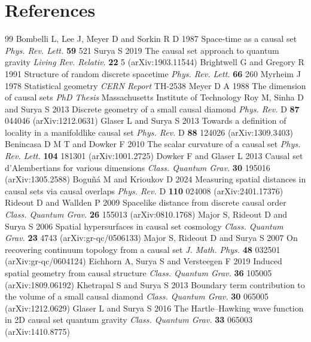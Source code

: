 \documentclass[12pt]{iopart}
\begin{document}
\section*{References}
\begin{thebibliography}{99}
 Bombelli L, Lee J, Meyer D and Sorkin R D 1987 Space-time as a causal set {\it Phys. Rev. Lett.} {\bf 59} 521
 Surya S 2019 The causal set approach to quantum gravity {\it Living Rev. Relativ.} {\bf 22} 5 (arXiv:1903.11544)
 Brightwell G and Gregory R 1991 Structure of random discrete spacetime {\it Phys. Rev. Lett.} {\bf 66} 260
 Myrheim J 1978 Statistical geometry {\it CERN Report} TH-2538
 Meyer D A 1988 The dimension of causal sets {\it PhD Thesis} Massachusetts Institute of Technology
 Roy M, Sinha D and Surya S 2013 Discrete geometry of a small causal diamond {\it Phys. Rev.} D {\bf 87} 044046 (arXiv:1212.0631)
 Glaser L and Surya S 2013 Towards a definition of locality in a manifoldlike causal set {\it Phys. Rev.} D {\bf 88} 124026 (arXiv:1309.3403)
 Benincasa D M T and Dowker F 2010 The scalar curvature of a causal set {\it Phys. Rev. Lett.} {\bf 104} 181301 (arXiv:1001.2725)
 Dowker F and Glaser L 2013 Causal set d'Alembertians for various dimensions {\it Class. Quantum Grav.} {\bf 30} 195016 (arXiv:1305.2588)
 Bogu\~n\'a M and Krioukov D 2024 Measuring spatial distances in causal sets via causal overlaps {\it Phys. Rev.} D {\bf 110} 024008 (arXiv:2401.17376)
 Rideout D and Wallden P 2009 Spacelike distance from discrete causal order {\it Class. Quantum Grav.} {\bf 26} 155013 (arXiv:0810.1768)
 Major S, Rideout D and Surya S 2006 Spatial hypersurfaces in causal set cosmology {\it Class. Quantum Grav.} {\bf 23} 4743 (arXiv:gr-qc/0506133)
 Major S, Rideout D and Surya S 2007 On recovering continuum topology from a causal set {\it J. Math. Phys.} {\bf 48} 032501 (arXiv:gr-qc/0604124)
 Eichhorn A, Surya S and Versteegen F 2019 Induced spatial geometry from causal structure {\it Class. Quantum Grav.} {\bf 36} 105005 (arXiv:1809.06192)
 Khetrapal S and Surya S 2013 Boundary term contribution to the volume of a small causal diamond {\it Class. Quantum Grav.} {\bf 30} 065005 (arXiv:1212.0629)
 Glaser L and Surya S 2016 The Hartle--Hawking wave function in 2D causal set quantum gravity {\it Class. Quantum Grav.} {\bf 33} 065003 (arXiv:1410.8775)

\end{thebibliography}
\end{document}
